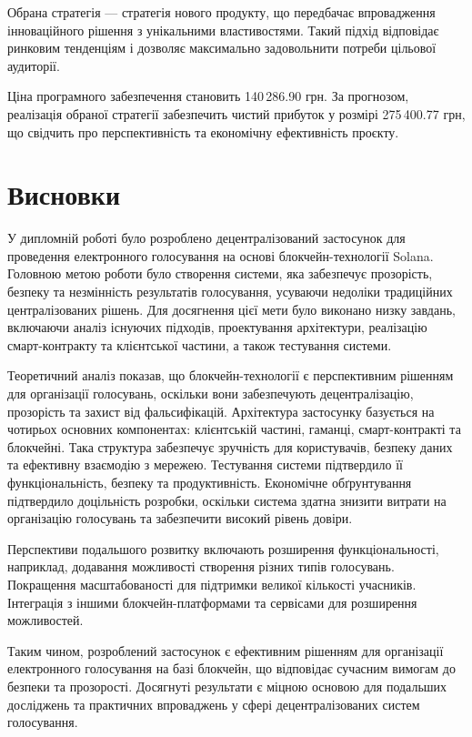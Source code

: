 \documentclass[14pt]{extreport}
\newcommand{\tocchap}[1]{
  \chapter*{#1}
  \addcontentsline{toc}{chapter}{\vspace{-7pt}\MakeUppercase{#1}}
}
\begin{document}
  Обрана стратегія — стратегія нового продукту, що передбачає впровадження інноваційного рішення з унікальними властивостями. Такий підхід відповідає ринковим тенденціям і дозволяє максимально задовольнити потреби цільової аудиторії.

  Ціна програмного забезпечення становить 140\,286.90 грн. За прогнозом, реалізація обраної стратегії забезпечить чистий прибуток у розмірі 275\,400.77 грн, що свідчить про перспективність та економічну ефективність проєкту.
  
  \tocchap{Висновки}
  
  У дипломній роботі було розроблено децентралізований застосунок для проведення електронного голосування на основі блокчейн-технології Solana. Головною метою роботи було створення системи, яка забезпечує прозорість, безпеку та незмінність результатів голосування, усуваючи недоліки традиційних централізованих рішень. Для досягнення цієї мети було виконано низку завдань, включаючи аналіз існуючих підходів, проектування архітектури, реалізацію смарт-контракту та клієнтської частини, а також тестування системи.
  
  Теоретичний аналіз показав, що блокчейн-технології є перспективним рішенням для організації голосувань, оскільки вони забезпечують децентралізацію, прозорість та захист від фальсифікацій. Архітектура застосунку базується на чотирьох основних компонентах: клієнтській частині, гаманці, смарт-контракті та блокчейні. Така структура забезпечує зручність для користувачів, безпеку даних та ефективну взаємодію з мережею. Тестування системи підтвердило її функціональність, безпеку та продуктивність. Економічне обґрунтування підтвердило доцільність розробки, оскільки система здатна знизити витрати на організацію голосувань та забезпечити високий рівень довіри.
  
  Перспективи подальшого розвитку включають розширення функціональності, наприклад, додавання можливості створення різних типів  голосувань. Покращення масштабованості для підтримки великої кількості учасників. Інтеграція з іншими блокчейн-платформами та сервісами для розширення можливостей.
  
  Таким чином, розроблений застосунок є ефективним рішенням для організації електронного голосування на базі блокчейн, що відповідає сучасним вимогам до безпеки та прозорості. Досягнуті результати є міцною основою для подальших досліджень та практичних впроваджень у сфері децентралізованих систем голосування.
  
\end{document}

